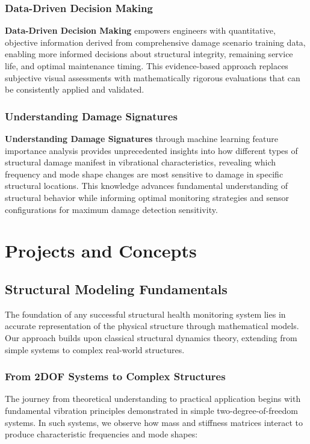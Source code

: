 \documentclass[11pt,a4paper]{article}
\begin{document}
\subsubsection{Data-Driven Decision Making}

\textbf{Data-Driven Decision Making} empowers engineers with quantitative, objective information derived from comprehensive damage scenario training data, enabling more informed decisions about structural integrity, remaining service life, and optimal maintenance timing. This evidence-based approach replaces subjective visual assessments with mathematically rigorous evaluations that can be consistently applied and validated.

\subsubsection{Understanding Damage Signatures}

\textbf{Understanding Damage Signatures} through machine learning feature importance analysis provides unprecedented insights into how different types of structural damage manifest in vibrational characteristics, revealing which frequency and mode shape changes are most sensitive to damage in specific structural locations. This knowledge advances fundamental understanding of structural behavior while informing optimal monitoring strategies and sensor configurations for maximum damage detection sensitivity.

\section{Projects and Concepts}

\subsection{Structural Modeling Fundamentals}

The foundation of any successful structural health monitoring system lies in accurate representation of the physical structure through mathematical models. Our approach builds upon classical structural dynamics theory, extending from simple systems to complex real-world structures.

\subsubsection{From 2DOF Systems to Complex Structures}

The journey from theoretical understanding to practical application begins with fundamental vibration principles demonstrated in simple two-degree-of-freedom systems. In such systems, we observe how mass and stiffness matrices interact to produce characteristic frequencies and mode shapes:
\end{document}
